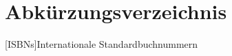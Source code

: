 \chapter*{Abkürzungsverzeichnis}

\begin{acronym}[WYSISWG] %

	[ISBNs]{Internationale Standardbuchnummern}

\end{acronym}
